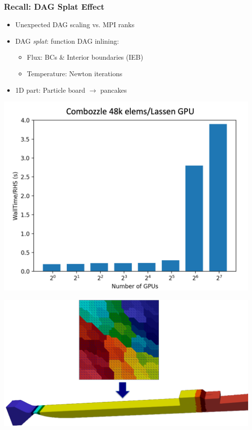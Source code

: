 \begin{frame}\frametitle{Recall: DAG Splat Effect}
\vspace{5pt}
  \begin{minipage}{0.49\textwidth}		
    \begin{itemize}
    \item Unexpected DAG scaling vs. MPI ranks
    \item DAG \textit{splat}: function DAG inlining:
    \begin{itemize}
    \item Flux: BCs \& Interior boundaries (IEB)
    \item Temperature: Newton iterations
    \end{itemize}
    \item 1D part: Particle board $\rightarrow$ pancakes
    \end{itemize}
    \begin{center}
    \includegraphics[width=.8\textwidth]{Figures/mtc/combozzle_weak_bad_partitioning.png}
    \end{center}
  \end{minipage}
  \begin{minipage}{0.49\textwidth}
      \centering
      \includegraphics[width=.8\textwidth]{Figures/mtc/MetisTo1D.png} \\

\end{minipage}
\end{frame}
